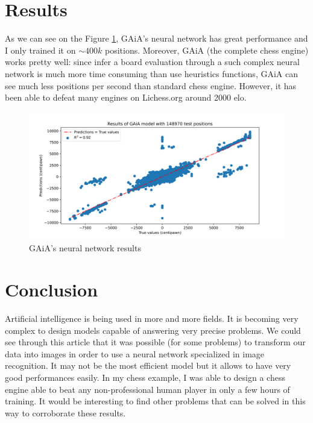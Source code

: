 \documentclass[a4paper]{article}
\begin{document}
\section{Results}
As we can see on the Figure \ref{fig:result}, GAiA's neural network
has great performance and I only trained it on $\sim 400k$ positions.
Moreover, GAiA (the complete chess engine) works pretty well:
since infer a board evaluation through a such complex neural network
is much more time consuming than use heuristics functions, GAiA can see
much less positions per second than standard chess engine. However,
it has been able to defeat many engines on Lichess.org around 2000 elo.


\begin{figure}[H]
  \centering
  \includegraphics[width=13cm]{result.png}
  \caption{GAiA's neural network results}
  \label{fig:result}
\end{figure}

\section{Conclusion}
Artificial intelligence is being used in more and more fields.
It is becoming very complex to design models capable of answering very precise problems.
We could see through this article that it was possible (for some problems) to transform
our data into images in order to use a neural network specialized in image recognition.
It may not be the most efficient model but it allows to have very good performances easily.
In my chess example, I was able to design a chess engine able to beat any non-professional
human player in only a few hours of training. It would be interesting to find other problems
that can be solved in this way to corroborate these results.



\end{document}
